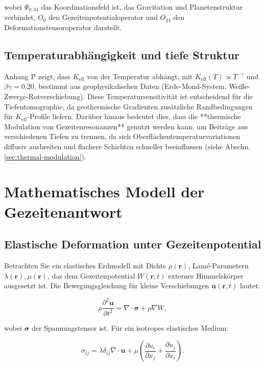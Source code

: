 \documentclass[12pt,a4paper]{article}
\theoremstyle{remark}
\newcommand{\Keff}{K_{\mathrm{eff}}}
\begin{document}
	wobei $\Psi_{0,34}$ das Koordinationsfeld ist, das Gravitation und Planetenstruktur verbindet, $O_0$ den Gezeitenpotentialoperator und $O_{34}$ den Deformationstensoroperator darstellt.
	
	\subsection{Temperaturabhängigkeit und tiefe Struktur}
	
	Anhang P zeigt, dass $\Keff$ von der Temperatur abhängt, mit $\Keff(T) \propto T^{-\gamma}$ und $\beta\gamma = 0.20$, bestimmt aus geophysikalischen Daten (Erde-Mond-System, Weiße-Zwerge-Rotverschiebung). Diese Temperatursensitivität ist entscheidend für die Tiefentomographie, da geothermische Gradienten zusätzliche Randbedingungen für $K_{\mathrm{eff}}$-Profile liefern. Darüber hinaus bedeutet dies, dass die **thermische Modulation von Gezeitenresonanzen** genutzt werden kann, um Beiträge aus verschiedenen Tiefen zu trennen, da sich Oberflächentemperaturvariationen diffusiv ausbreiten und flachere Schichten schneller beeinflussen (siehe Abschn. \ref{sec:thermal-modulation}).
	
	\section{Mathematisches Modell der Gezeitenantwort}
	\label{sec:model}
	
	\subsection{Elastische Deformation unter Gezeitenpotential}
	
	Betrachten Sie ein elastisches Erdmodell mit Dichte $\rho(\mathbf{r})$, Lamé-Parametern $\lambda(\mathbf{r}), \mu(\mathbf{r})$, das dem Gezeitenpotential $W(\mathbf{r},t)$ externer Himmelskörper ausgesetzt ist. Die Bewegungsgleichung für kleine Verschiebungen $\mathbf{u}(\mathbf{r},t)$ lautet:
	
	\begin{equation}
		\rho \frac{\partial^2 \mathbf{u}}{\partial t^2} = \nabla \cdot \boldsymbol{\sigma} + \rho \nabla W,
		\label{eq:motion}
	\end{equation}
	
	wobei $\boldsymbol{\sigma}$ der Spannungstensor ist. Für ein isotropes elastisches Medium:
	
	\begin{equation}
		\sigma_{ij} = \lambda \delta_{ij} \nabla \cdot \mathbf{u} + \mu \left(\frac{\partial u_i}{\partial x_j} + \frac{\partial u_j}{\partial x_i}\right).
		\label{eq:stress}
	\end{equation}
	
\end{document}
